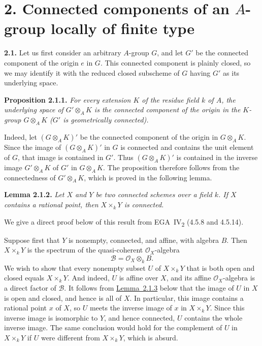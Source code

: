 \section*{2. Connected components of an \(A\)-group locally of finite type}
\label{sec:sga3-VIA-2}

\medskip
{}\label{par:sga3-VIA-2.1}%
\noindent\textbf{2.1.}
Let us first consider an arbitrary \(A\)-group \(G\), and let \(G'\) be
the connected component of the origin \(e\) in \(G\). This connected
component is plainly closed, so we may identify it with the reduced closed
subscheme of \(G\) having \(G'\) as its underlying space.%

\medskip
{}\label{prop:sga3-VIA-2.1.1}%
\noindent\textbf{Proposition 2.1.1.}
\textit{For every extension \(K\) of the residue field \(k\) of \(A\),
the underlying space of \(G'\otimes_AK\) is the connected component of the
origin in the \(K\)-group \(G\otimes_AK\) \textup{(}\(G'\) is
geometrically connected\textup{)}.}

\medskip
Indeed, let \((G\otimes_AK)'\) be the connected component of the origin in
\(G\otimes_AK\). Since the image of \((G\otimes_AK)'\) in \(G\) is
connected and contains the unit element of \(G\), that image is contained
in \(G'\). Thus \((G\otimes_AK)'\) is contained in the inverse image
\(G'\otimes_AK\) of \(G'\) in \(G\otimes_AK\). The proposition therefore
follows from the connectedness of \(G'\otimes_AK\), which is proved in the
following lemma.

\medskip
{}\label{lem:sga3-VIA-2.1.2}%
\noindent\textbf{Lemma 2.1.2.}
\textit{Let \(X\) and \(Y\) be two connected schemes over a field \(k\).
If \(X\) contains a rational point, then \(X\times_kY\) is connected.}

\medskip
We give a direct proof below of this result from EGA~IV\textsubscript{2}
(4.5.8 and 4.5.14).

Suppose first that \(Y\) is nonempty, connected, and affine, with algebra
\(B\). Then \(X\times_kY\) is the spectrum of the quasi-coherent
\(\mathcal O_X\)-algebra
\[
  \mathcal B=\mathcal O_X\otimes_kB.
\]
We wish to show that every nonempty subset \(U\) of \(X\times_kY\) that is
both open and closed equals \(X\times_kY\). And indeed, \(U\) is affine over \(X\),
and its affine \(\mathcal O_X\)-algebra is a direct factor of
\(\mathcal B\). It follows from \hyperref[lem:sga3-VIA-2.1.3]{Lemma~2.1.3} below that the image of \(U\)
in \(X\) is open and closed, and hence is all of \(X\). In particular,
this image contains a rational point \(x\) of \(X\), so \(U\) meets the
inverse image of \(x\) in \(X\times_kY\). Since this inverse image is
isomorphic to \(Y\), and hence connected, \(U\) contains the whole inverse
image. The same conclusion would hold for the complement of \(U\) in
\(X\times_kY\) if \(U\) were different from \(X\times_kY\), which is
absurd.

